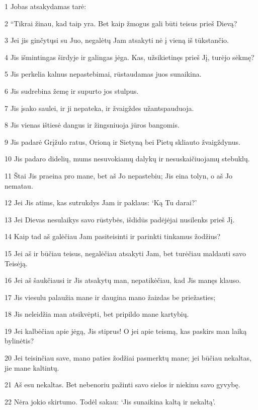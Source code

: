 \par 1 Jobas atsakydamas tarė: 
\par 2 “Tikrai žinau, kad taip yra. Bet kaip žmogus gali būti teisus prieš Dievą? 
\par 3 Jei jis ginčytųsi su Juo, negalėtų Jam atsakyti nė į vieną iš tūkstančio. 
\par 4 Jis išmintingas širdyje ir galingas jėga. Kas, užsikietinęs prieš Jį, turėjo sėkmę? 
\par 5 Jis perkelia kalnus nepastebimai, rūstaudamas juos sunaikina. 
\par 6 Jis sudrebina žemę ir supurto jos stulpus. 
\par 7 Jis įsako saulei, ir ji nepateka, ir žvaigždes užantspauduoja. 
\par 8 Jis vienas ištiesė dangus ir žingsniuoja jūros bangomis. 
\par 9 Jis padarė Grįžulo ratus, Orioną ir Sietyną bei Pietų skliauto žvaigždynus. 
\par 10 Jis padaro didelių, mums nesuvokiamų dalykų ir nesuskaičiuojamų stebuklų. 
\par 11 Štai Jis praeina pro mane, bet aš Jo nepastebiu; Jis eina tolyn, o aš Jo nematau. 
\par 12 Jei Jis atims, kas sutrukdys Jam ir paklaus: ‘Ką Tu darai?’ 
\par 13 Jei Dievas nesulaikys savo rūstybės, išdidūs padėjėjai nusilenks prieš Jį. 
\par 14 Kaip tad aš galėčiau Jam pasiteisinti ir parinkti tinkamus žodžius? 
\par 15 Jei aš ir būčiau teisus, negalėčiau atsakyti Jam, bet turėčiau maldauti savo Teisėją. 
\par 16 Jei aš šaukčiausi ir Jis atsakytų man, nepatikėčiau, kad Jis manęs klauso. 
\par 17 Jis viesulu palaužia mane ir daugina mano žaizdas be priežasties; 
\par 18 Jis neleidžia man atsikvėpti, bet pripildo mane kartybių. 
\par 19 Jei kalbėčiau apie jėgą, Jis stiprus! O jei apie teismą, kas paskirs man laiką bylinėtis? 
\par 20 Jei teisinčiau save, mano paties žodžiai pasmerktų mane; jei būčiau nekaltas, jie mane kaltintų. 
\par 21 Aš esu nekaltas. Bet nebenoriu pažinti savo sielos ir niekinu savo gyvybę. 
\par 22 Nėra jokio skirtumo. Todėl sakau: ‘Jis sunaikina kaltą ir nekaltą’. 
